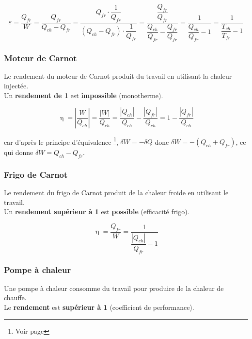 \documentclass[]{article}
\begin{document}
$$ \varepsilon 
= \dfrac{Q_{fr}}{W} 
= \dfrac{Q_{fr}}{Q_{ch} - Q_{fr}} 
= \dfrac{Q_{fr} \cdot \dfrac{1}{Q_{fr}}}{(Q_{ch} - Q_{fr}) \cdot \dfrac{1}{Q_{fr}}} 
= \dfrac{\dfrac{Q_{fr}}{Q_{fr}}}{\dfrac{Q_{ch}}{Q_{fr}} - \dfrac{Q_{fr}}{Q_{fr}}} 
= \dfrac{1}{\dfrac{Q_{ch}}{Q_{fr}} - 1}
= \dfrac{1}{\dfrac{T_{ch}}{T_{fr}} - 1} $$


\newpage


\subsubsection{Moteur de Carnot}

Le rendement du moteur de Carnot produit du travail en utilisant la chaleur injectée. \\

Un \textbf{rendement de 1} est \textbf{impossible} (monotherme).

$$ \upeta = \left| \dfrac{W}{Q_{ch} } \right| = \dfrac{| W |}{Q_{ch}}  = \dfrac{|Q_{ch}|}{Q_{ch}} - \dfrac{|Q_{fr}|}{Q_{ch}} =  1 - \dfrac{|Q_{fr}|}{Q_{ch}} $$


car d’après le \hyperref[principe-equivalence]{principe d’équivalence} \footnote{Voir page \pageref{principe-equivalence}}, $\delta W = -\delta Q$ donc $\delta W = -(Q_{ch} + Q_{fr})$, ce qui donne $\delta W = Q_{ch} - Q_{fr}$. \\


\subsubsection{Frigo de Carnot}

Le rendement du frigo de Carnot produit de la chaleur froide en utilisant le travail. \\

Un \textbf{rendement supérieur à 1} est \textbf{possible} (efficacité frigo).

$$ \upeta = \dfrac{Q_{fr}}{W} = \dfrac{1}{ \dfrac{|Q_{ch}|}{Q_{fr} } - 1 } $$



\subsubsection{Pompe à chaleur}

Une pompe à chaleur consomme du travail pour produire de la chaleur de chauffe. \\

Le \textbf{rendement} est \textbf{supérieur à 1} (coefficient de performance).
\end{document}
